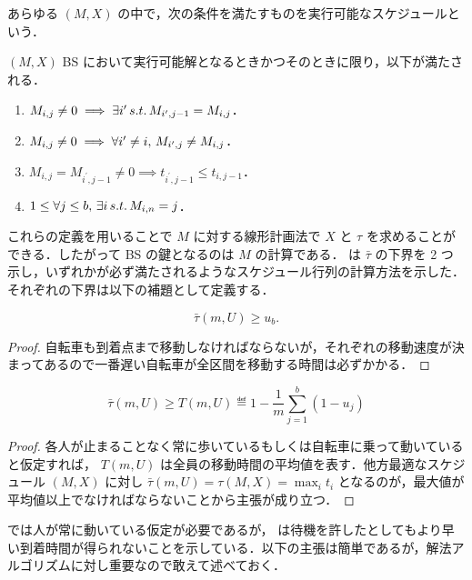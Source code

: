 あらゆる $(M, X)$ の中で，次の条件を満たすものを実行可能なスケジュールという．

\begin{definition}\label{definition:bs-feasible-schedule}
  $(M, X)$ BS において実行可能解となるときかつそのときに限り，以下が満たされる．
  \begin{enumerate}
  \item $M_{i, j} \neq 0 \implies \exists i^\prime \,s.t.\, M_{i^\prime, j - 1} = M_{i, j}$．
  \item $M_{i, j} \neq 0 \implies \forall i^\prime \neq i ,\, M_{i^\prime, j} \neq M_{i, j}$．
  \item $M_{i, j} = M_{i^\prime, j - 1} \neq 0 \implies t_{i^\prime,j-1} \leq t_{i,j-1}$．
  \item $1 \leq \forall j \leq b,\, \exists i \,s.t.\, M_{i,n} = j$．
  \end{enumerate}
\end{definition}

これらの定義を用いることで $M$ に対する線形計画法で $X$ と $\tau$ を求めることができる．したがって BS の鍵となるのは $M$ の計算である． \textcite{czyzowicz} は $\bar\tau$ の下界を 2 つ示し，いずれかが必ず満たされるようなスケジュール行列の計算方法を示した．それぞれの下界は以下の補題として定義する．

\begin{lemma}\label{lemma:lower-bound-bs-bike}
  \begin{equation}
    \bar\tau(m, U) \geq u_b.
  \end{equation}
\end{lemma}
\begin{proof}
  自転車も到着点まで移動しなければならないが，それぞれの移動速度が決まってあるので一番遅い自転車が全区間を移動する時間は必ずかかる．
\end{proof}

\begin{lemma}\label{lemma:lower-bound-bs}
  \begin{equation}
    \bar\tau(m, U) \geq T(m, U) \eqdef 1 - \frac{1}{m}\sum_{j = 1}^b(1 - u_j)
  \end{equation}
\end{lemma}
\begin{proof}
  各人が止まることなく常に歩いているもしくは自転車に乗って動いていると仮定すれば， $T(m, U)$ は全員の移動時間の平均値を表す．他方最適なスケジュール $(M, X)$ に対し $\bar\tau(m, U) = \tau(M, X) = \max_i t_i$ となるのが，最大値が平均値以上でなければならないことから主張が成り立つ．
\end{proof}
 では人が常に動いている仮定が必要であるが，\textcite{czyzowicz} は待機を許したとしてもより早い到着時間が得られないことを示している．以下の主張は簡単であるが，解法アルゴリズムに対し重要なので敢えて述べておく．

